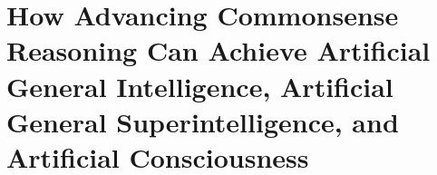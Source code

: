\chapter{How Advancing Commonsense Reasoning Can Achieve Artificial General Intelligence, Artificial General Superintelligence, and Artificial Consciousness}
